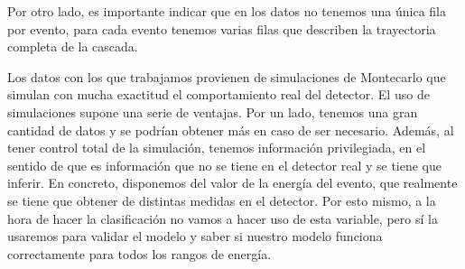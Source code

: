 \documentclass[a4paper,12pt,oneside,titlepage]{book}
\begin{document}
Por otro lado, es importante indicar que en los datos no tenemos una única fila por evento, para cada evento tenemos varias filas que describen la trayectoria completa de la cascada.

Los datos con los que trabajamos provienen de simulaciones de Montecarlo que simulan con mucha exactitud el comportamiento real del detector. El uso de simulaciones supone una serie de ventajas. Por un lado, tenemos una gran cantidad de datos y se podrían obtener más en caso de ser necesario. Además, al tener control total de la simulación, tenemos información privilegiada, en el sentido de que es información que no se tiene en el detector real y se tiene que inferir. En concreto, disponemos del valor de la energía del evento, que realmente se tiene que obtener de distintas medidas en el detector. Por esto mismo, a la hora de hacer la clasificación no vamos a hacer uso de esta variable, pero sí la usaremos para validar el modelo y saber si nuestro modelo funciona correctamente para todos los rangos de energía.
\end{document}
